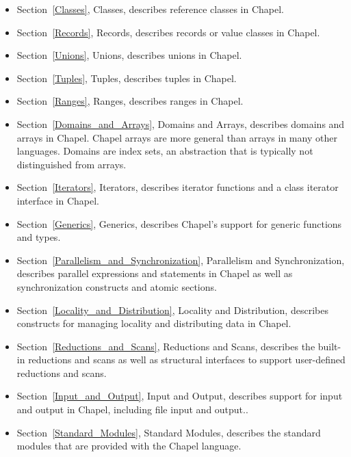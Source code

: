 \begin{itemize}
\item
Section~\ref{Classes}, Classes, describes reference classes in Chapel.

\item
Section~\ref{Records}, Records, describes records or value classes in
Chapel.

\item
Section~\ref{Unions}, Unions, describes unions in Chapel.

\item
Section~\ref{Tuples}, Tuples, describes tuples in Chapel.

\item
Section~\ref{Ranges}, Ranges, describes ranges in Chapel.

\item
Section~\ref{Domains_and_Arrays}, Domains and Arrays, describes
domains and arrays in Chapel.  Chapel arrays are more general than
arrays in many other languages.  Domains are index sets, an
abstraction that is typically not distinguished from arrays.

\item
Section~\ref{Iterators}, Iterators, describes iterator functions and a
class iterator interface in Chapel.

\item
Section~\ref{Generics}, Generics, describes Chapel's support for
generic functions and types.

\item
Section~\ref{Parallelism_and_Synchronization}, Parallelism and
Synchronization, describes parallel expressions and statements in
Chapel as well as synchronization constructs and atomic sections.

\item
Section~\ref{Locality_and_Distribution}, Locality and Distribution,
describes constructs for managing locality and distributing data in
Chapel.

\item
Section~\ref{Reductions_and_Scans}, Reductions and Scans, describes
the built-in reductions and scans as well as structural interfaces to
support user-defined reductions and scans.

\item
Section~\ref{Input_and_Output}, Input and Output, describes support
for input and output in Chapel, including file input and output..

\item
Section~\ref{Standard_Modules}, Standard Modules, describes the
standard modules that are provided with the Chapel language.

\end{itemize}
